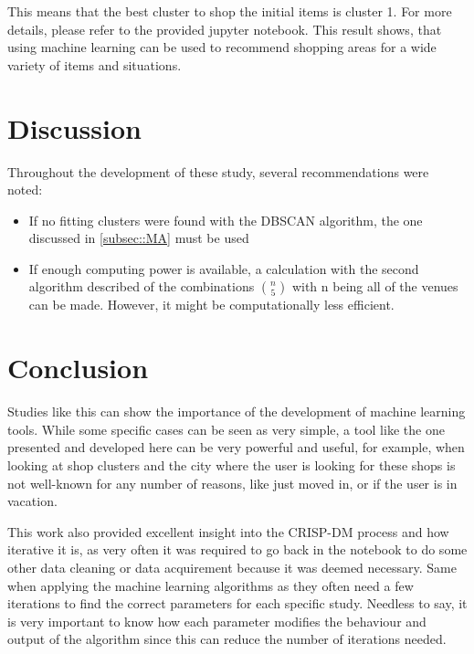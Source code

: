 \documentclass{article}
\begin{document}
	This means that the best cluster to shop the initial items is cluster 1. For more details, please refer to the provided jupyter notebook.
	This result shows, that using machine learning can be used to recommend shopping areas for a wide variety of items and situations.
\section{Discussion}
	Throughout the development of these study, several recommendations were noted:
	\begin{itemize}
		\item If no fitting clusters were found with the DBSCAN algorithm, the one discussed in \ref{subsec::MA} must be used
		\item If enough computing power is available, a calculation with the second algorithm described of the combinations $\binom{n}{5}$ with n being all of the venues can be made. However, it might be computationally less efficient.
	\end{itemize}
\section{Conclusion}
	Studies like this can show the importance of the development of machine learning tools. While some specific cases can be seen as very simple, a tool like the one presented and developed here can be very powerful and useful, for example, when looking at shop clusters and the city where the user is looking for these shops is not well-known for any number of reasons, like just moved in, or if the user is in vacation.
	\newline
	\newline
	
	This work also provided excellent insight into the CRISP-DM process and how iterative it is, as very often it was required to go back in the notebook to do some other data cleaning or data acquirement because it was deemed necessary. Same when applying the machine learning algorithms as they often need a few iterations to find the correct parameters for each specific study. Needless to say, it is very important to know how each parameter modifies the behaviour and output of the algorithm since this can reduce the number of iterations needed.
	
	
	
	
	
	
	
\end{document}
